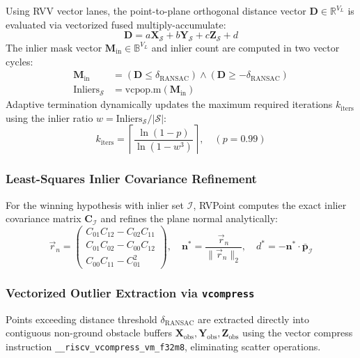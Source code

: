 \documentclass[journal,compsoc]{IEEEtran}
\begin{document}
Using RVV vector lanes, the point-to-plane orthogonal distance vector $\mathbf{D} \in \mathbb{R}^{V_L}$ is evaluated via vectorized fused multiply-accumulate:
\begin{equation}
\mathbf{D} = a \mathbf{X}_{\mathcal{S}} + b \mathbf{Y}_{\mathcal{S}} + c \mathbf{Z}_{\mathcal{S}} + d
\label{eq:vec_dist}
\end{equation}
The inlier mask vector $\mathbf{M}_{\text{in}} \in \mathbb{B}^{V_L}$ and inlier count are computed in two vector cycles:
\begin{align}
\mathbf{M}_{\text{in}} &= (\mathbf{D} \le \delta_{\text{RANSAC}}) \land (\mathbf{D} \ge -\delta_{\text{RANSAC}}) \\
\text{Inliers}_{\mathcal{S}} &= \text{vcpop.m}(\mathbf{M}_{\text{in}})
\end{align}
Adaptive termination dynamically updates the maximum required iterations $k_{\text{iters}}$ using the inlier ratio $w = \text{Inliers}_{\mathcal{S}} / |\mathcal{S}|$:
\begin{equation}
k_{\text{iters}} = \left\lceil \frac{\ln(1 - p)}{\ln(1 - w^3)} \right\rceil, \quad (p = 0.99)
\label{eq:adaptive_iters}
\end{equation}

\subsubsection{Least-Squares Inlier Covariance Refinement}
For the winning hypothesis with inlier set $\mathcal{I}$, RVPoint computes the exact inlier covariance matrix $\mathbf{C}_{\mathcal{I}}$ and refines the plane normal analytically:
\begin{equation}
\vec{r}_n = \begin{pmatrix} C_{01}C_{12} - C_{02}C_{11} \\ C_{01}C_{02} - C_{00}C_{12} \\ C_{00}C_{11} - C_{01}^2 \end{pmatrix}, \quad \bm{n}^* = \frac{\vec{r}_n}{\|\vec{r}_n\|_2}, \quad d^* = -\bm{n}^* \cdot \bar{\bm{p}}_{\mathcal{I}}
\label{eq:refined_plane}
\end{equation}

\subsubsection{Vectorized Outlier Extraction via \texttt{vcompress}}
Points exceeding distance threshold $\delta_{\text{RANSAC}}$ are extracted directly into contiguous non-ground obstacle buffers $\mathbf{X}_{\text{obs}}, \mathbf{Y}_{\text{obs}}, \mathbf{Z}_{\text{obs}}$ using the vector compress instruction \texttt{\_\_riscv\_vcompress\_vm\_f32m8}, eliminating scatter operations.
\end{document}

